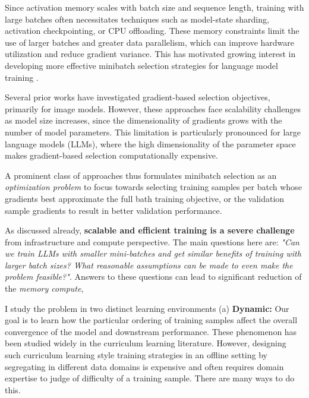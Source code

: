 \documentclass[11pt,a4paper,sans,usenames,dvipsnames]{moderncv} %
\begin{document}
Since activation memory scales with batch size and sequence length, training with large batches often necessitates techniques such as model-state sharding, activation checkpointing, or CPU offloading. These memory constraints limit the use of larger batches and greater data parallelism, which can improve hardware utilization and reduce gradient variance. This has motivated growing interest in developing more effective minibatch selection strategies for language model training \cite{nguyen2025colm, chandauniprot, agrawal2026minibatch}.

Several prior works \cite{killamsetty2021grad, killamsetty2021glister, mirzasoleiman2020coresets} have investigated gradient-based selection objectives, primarily for image models. However, these approaches face scalability challenges as model size increases, since the dimensionality of gradients grows with the number of model parameters. This limitation is particularly pronounced for large language models (LLMs), where the high dimensionality of the parameter space makes gradient-based selection computationally expensive.

A prominent class of approaches thus formulates minibatch selection as an \emph{optimization problem} to focus towards selecting training samples per batch whose gradients best approximate the full bath training objective, or the validation sample gradients to result in better validation performance.

As discussed already, \textbf{scalable and efficient training is a severe challenge} from infrastructure and compute perspective. The main questions here are: \textit{"Can we train LLMs with smaller mini-batches and get similar benefits of training with larger batch
sizes? What reasonable assumptions can be made to even make the problem feasible?"}. Answers to these questions can lead to significant reduction of the \textit{memory compute}, %

I study the problem in two distinct learning environments (a)  \textbf{Dynamic:} Our goal is to learn how the particular ordering of training samples affect the overall convergence of the model and downstream performance. These phenomenon has been studied widely in the curriculum learning literature. However, designing such curriculum learning style training strategies in an offline setting by segregating in different data domains is expensive and often requires domain expertise to judge of difficulty of a training sample. There are many ways to do this. \cite{killamsetty2023milo}
\end{document}

